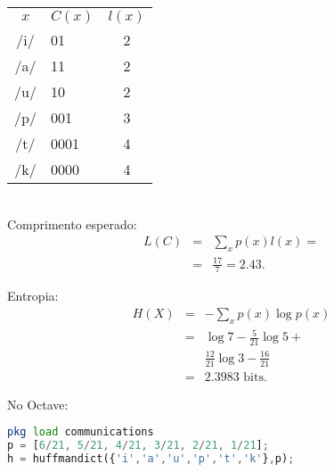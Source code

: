 \begin{questions}
\begin{solution}
\begin{parts}
\begin{minipage}[b]{0.6\textwidth}
\end{minipage}
  \hfill
\begin{minipage}[b]{0.35\textwidth}
   \begin{center}
   \begin{tabular}[b]{clc}
        $x$ & $C(x)$ & $l(x)$ \\
        /i/ & 01  & 2 \\
        /a/ & 11  & 2 \\
        /u/ & 10  & 2 \\
        /p/ & 001 & 3 \\
        /t/ & 0001 & 4 \\
        /k/ & 0000 & 4
   \end{tabular}
   \end{center}

   \ \\
   Comprimento esperado:
   \begin{eqnarray}
   L(C) &=& \sum_x p(x) l(x) = \nonumber \\
        &=& \frac{17}{7} = 2.43  .
   \end{eqnarray}

   Entropia:
   \begin{eqnarray}
   H(X) &=& - \sum_x p(x) \log p(x) \nonumber \\ 
        &=& \log 7 - \frac{5}{21} \log 5 + \nonumber \\
	    && \frac{12}{21} \log 3 - \frac{16}{21} \nonumber \\
        &=& 2.3983 \text{ bits} .
   \end{eqnarray}
\end{minipage}

No Octave:
\begin{lstlisting}[language=Octave]
pkg load communications
p = [6/21, 5/21, 4/21, 3/21, 2/21, 1/21];
h = huffmandict({'i','a','u','p','t','k'},p);
\end{lstlisting}




\end{parts}
\end{solution}
\end{questions}
